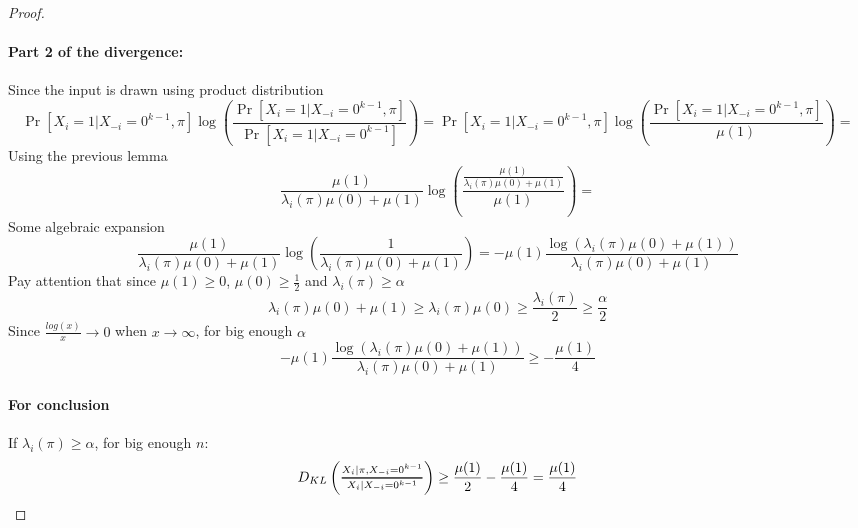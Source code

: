 \documentclass{article}
\newcommand{\Dfrac}[2]{%
  \ooalign{%
    $\genfrac{}{}{1.2pt}1{#1}{#2}$\cr%
    $\color{white}\genfrac{}{}{.4pt}1{\phantom{#1}}{\phantom{#2}}$}%
}
\theoremstyle{plain}
\begin{document}
\begin{proof}
\paragraph{Part 2 of the divergence:}
Since the input is drawn using product distribution
\begin{equation*}
    \Pr[X_i = 1 | X_{-i}=0^{k-1}, \pi]\log\left(\frac{\Pr[X_i = 1 | X_{-i}=0^{k-1}, \pi]}{\Pr[X_i = 1 | X_{-i}=0^{k-1}]}\right) = \Pr[X_i = 1 | X_{-i}=0^{k-1}, \pi]\log\left(\frac{\Pr[X_i = 1 | X_{-i}=0^{k-1}, \pi]}{\mu(1)}\right) = 
\end{equation*}
Using the previous lemma
\begin{equation*}
    \frac{\mu(1)}{\lambda_i(\pi)\mu(0) + \mu(1)}\log\left(\frac{\frac{\mu(1)}{\lambda_i(\pi)\mu(0) + \mu(1)}}{\mu(1)}\right) = 
\end{equation*}
Some algebraic expansion
\begin{equation*}
    \frac{\mu(1)}{\lambda_i(\pi)\mu(0) + \mu(1)}\log\left(\frac{1}{\lambda_i(\pi)\mu(0) + \mu(1)}\right) = -\mu(1) \frac{\log(\lambda_i(\pi)\mu(0) + \mu(1))}{\lambda_i(\pi)\mu(0) + \mu(1)}
\end{equation*}
Pay attention that since $ \mu(1) \geq 0$, $\mu(0) \geq \frac{1}{2}$ and $\lambda_i(\pi) \geq \alpha$
\begin{equation*}
    \lambda_i(\pi)\mu(0) + \mu(1) \geq \lambda_i(\pi)\mu(0) \geq \frac{\lambda_i(\pi)}{2} \geq \frac{\alpha}{2}
\end{equation*}
Since $\frac{log(x)}{x} \rightarrow 0$ when $x \rightarrow \infty$, for big enough $\alpha$
\begin{equation*}
    -\mu(1) \frac{\log(\lambda_i(\pi)\mu(0) + \mu(1))}{\lambda_i(\pi)\mu(0) + \mu(1)} \geq -\frac{\mu(1)}{4}
\end{equation*}
\paragraph{For conclusion}
If $\lambda_i(\pi) \geq \alpha$, for big enough $n$:
\begin{equation*}
     D_{KL}\left(\Dfrac{X_i | \pi, X_{-i} = 0^{k-1}}{X_i | X_{-i} = 0^{k-1}} \right) \geq \frac{\mu(1)}{2} -\frac{\mu(1)}{4} = \frac{\mu(1)}{4}
\end{equation*}
\end{proof}
\end{document}

